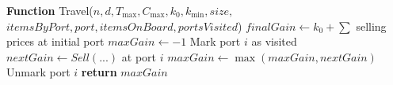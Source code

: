 \documentclass[12pt, a4paper]{article}
\begin{document}
\begin{algorithmic}[1]
\STATE

\STATE \textbf{Function} Travel($n, d, T_{\max}, C_{\max}, k_0, k_{\min}, size,$
\STATE \hspace{1cm} $itemsByPort, port, itemsOnBoard, portsVisited$)
\STATE $finalGain \gets k_0 + \sum$ selling prices at initial port
\STATE $maxGain \gets -1$
        \STATE Mark port $i$ as visited
        \STATE $nextGain \gets Sell(...)$ at port $i$
        \STATE $maxGain \gets \max(maxGain, nextGain)$
        \STATE Unmark port $i$
    \ENDIF
\ENDFOR
\STATE \textbf{return} $maxGain$

\end{algorithmic}

\

\begin{algorithm}
\caption{Fuerza Bruta. Claudia Hernández Pérez}\label{alg:chp}
\end{algorithm}
\end{document}
